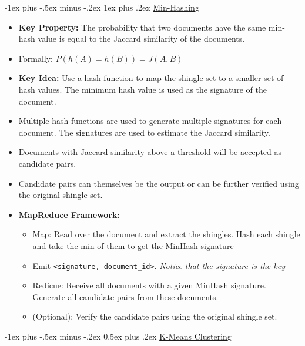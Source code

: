 \documentclass[10pt, landscape]{article}
\makeatletter
\renewcommand{\section}{\@startsection{section}{1}{0mm}%
  {-1ex plus -.5ex minus -.2ex}%
  {0.5ex plus .2ex}%
{\normalfont\large\bfseries}}
\renewcommand{\subsubsection}{\@startsection{subsubsection}{3}{0mm}%
  {-1ex plus -.5ex minus -.2ex}%
  {1ex plus .2ex}%
{\normalfont\small\bfseries}}%
\makeatother
\begin{document}
\begin{multicols*}{4}
  \subsubsection{\underline{Min-Hashing}}
  \begin{itemize}
    \item \textbf{Key Property:} The probability that two documents have the same min-hash value is equal to the Jaccard similarity of the documents.
    \item Formally: $P(h(A) = h(B)) = J(A, B)$
    \item \textbf{Key Idea:} Use a hash function to map the shingle set to a smaller set of hash values. The minimum hash value is used as the signature of the document.
    \item Multiple hash functions are used to generate multiple signatures for each document. The signatures are used to estimate the Jaccard similarity.
    \item Documents with Jaccard similarity above a threshold will be accepted as candidate pairs.
    \item Candidate pairs can themselves be the output or can be further verified using the original shingle set.
    \item \textbf{MapReduce Framework:}
    \begin{itemize}
      \item Map: Read over the document and extract the shingles. Hash each shingle and take the min of them to get the MinHash signature
      \item Emit \texttt{<signature, document\_id>}. \textit{Notice that the signature is the key}
      \item Redicue: Receive all documents with a given MinHash signature. Generate all candidate pairs from these documents.
      \item (Optional): Verify the candidate pairs using the original shingle set.
    \end{itemize}
  \end{itemize}

  \section{\underline{K-Means Clustering}}


\end{multicols*}
\end{document}
